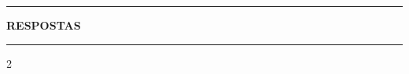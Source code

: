 \documentclass[12pt]{exam}
\begin{document}
\newpage


\hrule

\begin{center}
    {\large\bf RESPOSTAS}
\end{center}

\hrule

\begin{multicols}{2}
    
\end{multicols}
\end{document}
